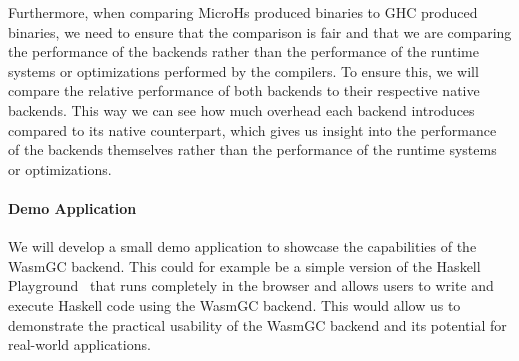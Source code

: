Furthermore, when comparing MicroHs produced binaries to GHC produced binaries, we need to ensure that the comparison is fair and that we are comparing the performance of the backends rather than the performance of the runtime systems or optimizations performed by the compilers. To ensure this, we will compare the relative performance of both backends to their respective native backends. This way we can see how much overhead each backend introduces compared to its native counterpart, which gives us insight into the performance of the backends themselves rather than the performance of the runtime systems or optimizations.

\paragraph{Demo Application} We will develop a small demo application to showcase the capabilities of the WasmGC backend. This could for example be a simple version of the Haskell Playground~\cite{haskellplayground} that runs completely in the browser and allows users to write and execute Haskell code using the WasmGC backend. This would allow us to demonstrate the practical usability of the WasmGC backend and its potential for real-world applications.


